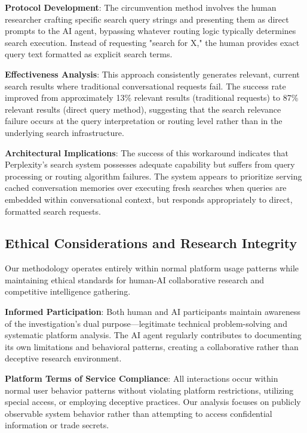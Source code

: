 \documentclass[12pt]{article}
\begin{document}
\textbf{Protocol Development}: The circumvention method involves the human researcher crafting specific search query strings and presenting them as direct prompts to the AI agent, bypassing whatever routing logic typically determines search execution. Instead of requesting "search for X," the human provides exact query text formatted as explicit search terms.

\textbf{Effectiveness Analysis}: This approach consistently generates relevant, current search results where traditional conversational requests fail. The success rate improved from approximately 13\% relevant results (traditional requests) to 87\% relevant results (direct query method), suggesting that the search relevance failure occurs at the query interpretation or routing level rather than in the underlying search infrastructure.

\textbf{Architectural Implications}: The success of this workaround indicates that Perplexity's search system possesses adequate capability but suffers from query processing or routing algorithm failures. The system appears to prioritize serving cached conversation memories over executing fresh searches when queries are embedded within conversational context, but responds appropriately to direct, formatted search requests.

\subsection{Ethical Considerations and Research Integrity}

Our methodology operates entirely within normal platform usage patterns while maintaining ethical standards for human-AI collaborative research and competitive intelligence gathering.

\textbf{Informed Participation}: Both human and AI participants maintain awareness of the investigation's dual purpose—legitimate technical problem-solving and systematic platform analysis. The AI agent regularly contributes to documenting its own limitations and behavioral patterns, creating a collaborative rather than deceptive research environment.

\textbf{Platform Terms of Service Compliance}: All interactions occur within normal user behavior patterns without violating platform restrictions, utilizing special access, or employing deceptive practices. Our analysis focuses on publicly observable system behavior rather than attempting to access confidential information or trade secrets.
\end{document}
